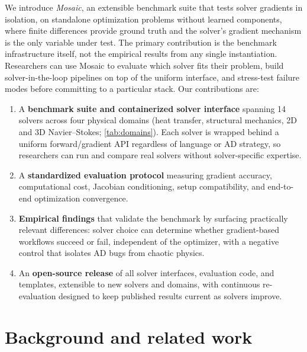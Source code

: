\documentclass[11pt,a4paper]{article}
\begin{document}
We introduce \textit{Mosaic}, an extensible benchmark suite that
tests solver gradients in isolation, on standalone optimization
problems without learned components, where finite differences provide
ground truth and the solver's gradient mechanism is the only variable
under test. The primary contribution is the benchmark
infrastructure itself, not the empirical results from any single
instantiation. Researchers can use Mosaic to evaluate which solver fits
their problem, build solver-in-the-loop pipelines on top of the
uniform interface, and stress-test failure modes before
committing to a particular stack. Our contributions are:
%
\begin{enumerate}\itemsep2pt
  \item A \textbf{benchmark suite and containerized solver interface}
    spanning 14 solvers across four physical domains (heat transfer,
    structural mechanics, 2D and 3D Navier--Stokes;
    \cref{tab:domains}). Each solver is wrapped behind a uniform
    forward/gradient API regardless of language or AD strategy, so
    researchers can run and compare real solvers without
    solver-specific expertise.
  \item A \textbf{standardized evaluation protocol} measuring gradient
    accuracy, computational cost, Jacobian conditioning, setup
    compatibility, and end-to-end optimization convergence.
  \item \textbf{Empirical findings} that validate the benchmark by
    surfacing practically relevant differences: solver choice can
    determine whether gradient-based workflows succeed or fail,
    independent of the optimizer,
    with a negative control that isolates AD bugs from chaotic physics.
  \item An \textbf{open-source release} of all solver interfaces, evaluation
    code, and templates, extensible to new solvers and domains, with
    continuous re-evaluation designed to keep published results current
    as solvers improve.
\end{enumerate}

\section{Background and related work}
\label{sec:related}
\end{document}
